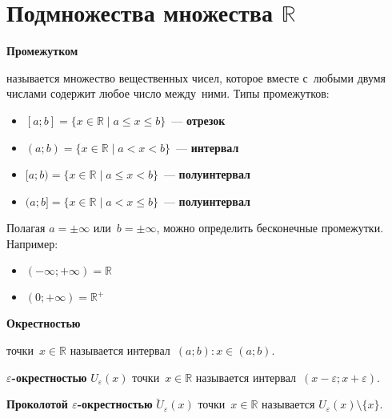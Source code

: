 \section{Подмножества множества \texorpdfstring{$\mathbb R$}{}}
\hypertarget{def:interval}{\textbf{Промежутком}} называется множество вещественных чисел, которое вместе с~любыми двумя числами содержит любое число между~ними.
Типы промежутков:
\begin{itemize}
	\item \hypertarget{def:closed_interval}{} $[a; b] = \{ x \in \mathbb R \mid a \leqslant x \leqslant b \}$~--- \textbf{отрезок}
	\item \hypertarget{def:open_interval}{} $(a; b) = \{ x \in \mathbb R \mid a < x < b \}$~--- \textbf{интервал}
	\item $[a; b) = \{ x \in \mathbb R \mid a \leqslant x < b \}$~--- \textbf{полуинтервал}
	\item $(a; b] = \{ x \in \mathbb R \mid a < x \leqslant b \}$~--- \textbf{полуинтервал}
\end{itemize}

Полагая $a = \pm\infty$ или~$b = \pm\infty$, можно определить бесконечные промежутки. Например:
\begin{itemize}
	\item $(-\infty; +\infty) = \mathbb R$
	\item $(0; +\infty) = \mathbb R^+$
\end{itemize}

\hypertarget{def:neighbourhood}{\textbf{Окрестностью}} точки~$x \in \mathbb R$ называется интервал~$(a; b) \colon x \in (a; b)$.

\textbf{$\varepsilon$-окрестностью} $U_\varepsilon(x)$ точки~$x \in \mathbb R$ называется интервал~$(x - \varepsilon; x + \varepsilon)$.

\textbf{Проколотой $\varepsilon$-окрестностью} $\breve U_\varepsilon(x)$ точки~$x \in \mathbb R$ называется $U_\varepsilon(x) \setminus \{ x \}$.
